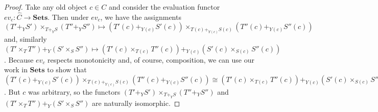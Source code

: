 \documentclass[12pt]{article}
\newcommand{\from}{\colon}
\renewcommand{\(}{\left(}
\renewcommand{\)}{\right)}
\renewcommand{\{}{\left\lbrace}
\renewcommand{\}}{\right\rbrace}
\theoremstyle{remark}
\theoremstyle{definition}
\begin{document}
\begin{proof}
	Take any old object $c \in C$ and consider the evaluation functor $ev_c \from \widehat{C} \to \mathbf{Sets}$. Then under $ev_c$, we have the assignments $(T' +_Y S') \times_{T +_Y S} (T''+_Y S'') \mapsto (T'(c) +_{Y(c)} S'(c)) \times_{T(c) +_{Y(c)} S(c)} (T''(c)+_{Y(c)} S''(c))$ and, similarly $(T' \times_{T} T'') +_{Y} (S' \times_{S} S'') \mapsto (T'(c) \times_{T(c)} T''(c)) +_{Y(c)} (S'(c) \times_{S(c)} S''(c))$.  Because $ev_c$ respects monotonicity and, of course, composition, we can use our work in $\mathbf{Sets}$ to show that $(T'(c) +_{Y(c)} S'(c)) \times_{T(c) +_{Y(c)} S(c)} (T''(c)+_{Y(c)} S''(c)) \cong (T'(c) \times_{T(c)} T''(c)) +_{Y(c)} (S'(c) \times_{S(c)} S''(c))$.  But $c$ was arbitrary, so the functors $(T' +_Y S') \times_{T +_Y S} (T''+_Y S'')$ and $(T' \times_{T} T'') +_{Y} (S' \times_{S} S'')$ are naturally isomorphic. 
	

\end{proof}
\end{document}
